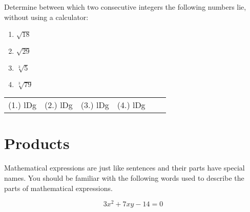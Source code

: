 \begin{exercises}{}
 {
Determine between which two consecutive integers the following numbers lie, without using a calculator:
\begin{enumerate}[itemsep=5pt, label=\textbf{\arabic*}. ]
\item $\sqrt{18}$
\item $\sqrt{29}$
\item $\sqrt[3]{5}$
\item $\sqrt[3]{79}$

\end{enumerate}
\practiceinfo 
\par 
 \par \begin{tabular}[h]{cccccc}
 (1.) lDg  &  (2.) lDg  &  (3.) lDg  & (4.) lDg &  \end{tabular}
}
\end{exercises}



\section{Products}
\setcounter{figure}{1}
\setcounter{subfigure}{1}
%   
\nopagebreak
Mathematical expressions are just like sentences and their parts have special names. You should be familiar with the following words used to describe the parts of  mathematical expressions.\par 

\begin{equation*}
3x^2 + 7xy -14 = 0
\end{equation*}



